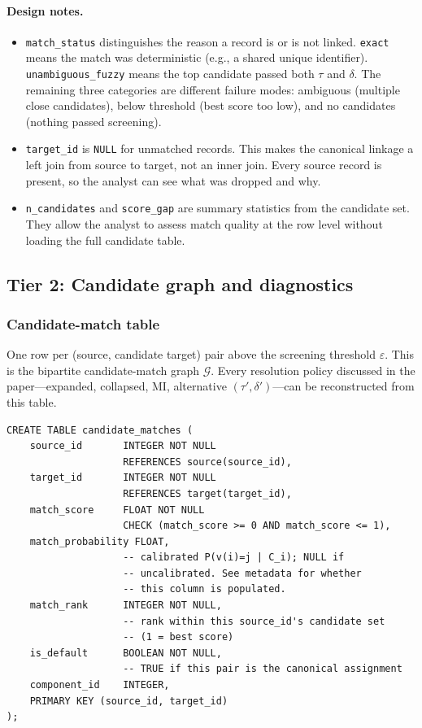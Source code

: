\paragraph{Design notes.}
\begin{itemize}
    \item \texttt{match\_status} distinguishes the reason a record is or is not linked. \texttt{exact} means the match was deterministic (e.g., a shared unique identifier). \texttt{unambiguous\_fuzzy} means the top candidate passed both $\tau$ and $\delta$. The remaining three categories are different failure modes: ambiguous (multiple close candidates), below threshold (best score too low), and no candidates (nothing passed screening).
    \item \texttt{target\_id} is \texttt{NULL} for unmatched records. This makes the canonical linkage a left join from source to target, not an inner join. Every source record is present, so the analyst can see what was dropped and why.
    \item \texttt{n\_candidates} and \texttt{score\_gap} are summary statistics from the candidate set. They allow the analyst to assess match quality at the row level without loading the full candidate table.
\end{itemize}

\subsection{Tier 2: Candidate graph and diagnostics}

\subsubsection{Candidate-match table}

One row per (source, candidate target) pair above the screening threshold $\varepsilon$. This is the bipartite candidate-match graph $\mathcal{G}$. Every resolution policy discussed in the paper---expanded, collapsed, MI, alternative $(\tau',\delta')$---can be reconstructed from this table.

\begin{lstlisting}[style=sql]
CREATE TABLE candidate_matches (
    source_id       INTEGER NOT NULL
                    REFERENCES source(source_id),
    target_id       INTEGER NOT NULL
                    REFERENCES target(target_id),
    match_score     FLOAT NOT NULL
                    CHECK (match_score >= 0 AND match_score <= 1),
    match_probability FLOAT,
                    -- calibrated P(v(i)=j | C_i); NULL if
                    -- uncalibrated. See metadata for whether
                    -- this column is populated.
    match_rank      INTEGER NOT NULL,
                    -- rank within this source_id's candidate set
                    -- (1 = best score)
    is_default      BOOLEAN NOT NULL,
                    -- TRUE if this pair is the canonical assignment
    component_id    INTEGER,
    PRIMARY KEY (source_id, target_id)
);
\end{lstlisting}

